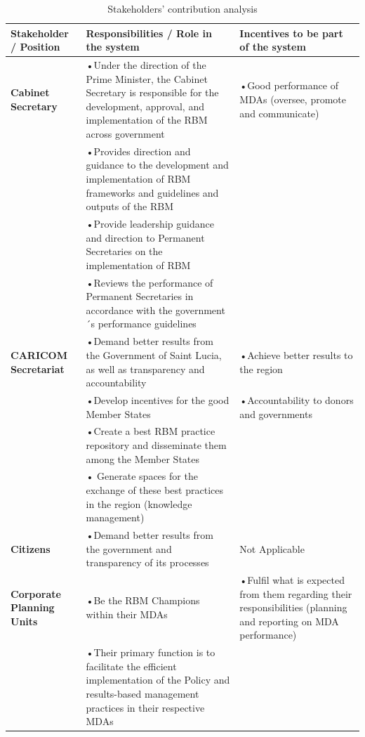 \documentclass[
  10pt,
]{book}
\begin{document}
\begin{table}

\caption{\label{tab:unnamed-chunk-8}Stakeholders’ contribution analysis}
\centering
\fontsize{12}{14}\selectfont
\begin{tabu} to 
\hline
Stakeholder / Position & Responsibilities / Role in the system & Incentives to be part of the system\\
\hline
\textbf{Cabinet Secretary} & •Under the direction of the Prime Minister, the Cabinet Secretary is responsible for the development, approval, and implementation of the RBM across government & •Good performance of MDAs (oversee, promote and communicate)\\
\hline
\textbf{} & •Provides direction and guidance to the development and implementation of RBM frameworks and guidelines and outputs of the RBM & \\
\hline
\textbf{} & •Provide leadership guidance and direction to Permanent Secretaries on the implementation of RBM & \\
\hline
\textbf{} & •Reviews the performance of Permanent Secretaries in accordance with the government´s performance guidelines & \\
\hline
\textbf{CARICOM Secretariat} & •Demand better results from the Government of Saint Lucia, as well as transparency and accountability & •Achieve better results to the region\\
\hline
\textbf{} & •Develop incentives for the good Member States & •Accountability to donors and governments\\
\hline
\textbf{} & •Create a best RBM practice repository and disseminate them among the Member States & \\
\hline
\textbf{} & • Generate spaces for the exchange of these best practices in the region (knowledge management) & \\
\hline
\textbf{Citizens} & •Demand better results from the government and transparency of its processes & Not Applicable\\
\hline
\textbf{Corporate Planning Units} & •Be the RBM Champions within their MDAs & •Fulfil what is expected from them regarding their responsibilities (planning and reporting on MDA performance)\\
\hline
\textbf{} & •Their primary function is to facilitate the efficient implementation of the Policy and results-based management practices in their respective MDAs & \\
\hline

\end{tabu}
\end{table}
\end{document}
